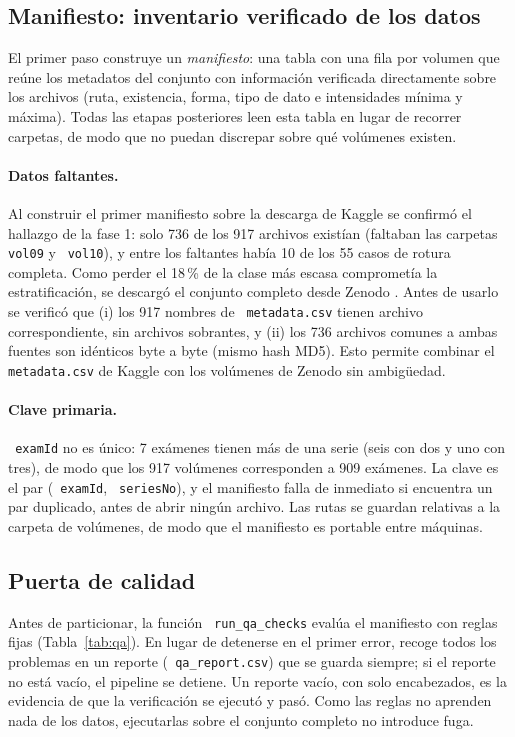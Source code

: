 \documentclass[12pt,letterpaper]{article}
\newcommand{\code}[1]{\texttt{\hyphenchar\font=-1 #1}}
\begin{document}
\subsection{Manifiesto: inventario verificado de los datos}\label{sec:manifiesto}

El primer paso construye un \emph{manifiesto}: una tabla con una fila por volumen que reúne los metadatos del conjunto con información verificada directamente sobre los archivos (ruta, existencia, forma, tipo de dato e intensidades mínima y máxima). Todas las etapas posteriores leen esta tabla en lugar de recorrer carpetas, de modo que no puedan discrepar sobre qué volúmenes existen.

\paragraph{Datos faltantes.} Al construir el primer manifiesto sobre la descarga de Kaggle se confirmó el hallazgo de la fase 1: solo 736 de los 917 archivos existían (faltaban las carpetas \code{vol09} y \code{vol10}), y entre los faltantes había 10 de los 55 casos de rotura completa. Como perder el 18\,\% de la clase más escasa comprometía la estratificación, se descargó el conjunto completo desde Zenodo \cite{zenodo_kneemri}. Antes de usarlo se verificó que (i) los 917 nombres de \code{metadata.csv} tienen archivo correspondiente, sin archivos sobrantes, y (ii) los 736 archivos comunes a ambas fuentes son idénticos byte a byte (mismo hash MD5). Esto permite combinar el \code{metadata.csv} de Kaggle con los volúmenes de Zenodo sin ambigüedad.

\paragraph{Clave primaria.} \code{examId} no es único: 7 exámenes tienen más de una serie (seis con dos y uno con tres), de modo que los 917 volúmenes corresponden a 909 exámenes. La clave es el par (\code{examId}, \code{seriesNo}), y el manifiesto falla de inmediato si encuentra un par duplicado, antes de abrir ningún archivo. Las rutas se guardan relativas a la carpeta de volúmenes, de modo que el manifiesto es portable entre máquinas.

\subsection{Puerta de calidad}

Antes de particionar, la función \code{run\_qa\_checks} evalúa el manifiesto con reglas fijas (Tabla~\ref{tab:qa}). En lugar de detenerse en el primer error, recoge todos los problemas en un reporte (\code{qa\_report.csv}) que se guarda siempre; si el reporte no está vacío, el pipeline se detiene. Un reporte vacío, con solo encabezados, es la evidencia de que la verificación se ejecutó y pasó. Como las reglas no aprenden nada de los datos, ejecutarlas sobre el conjunto completo no introduce fuga.
\end{document}
